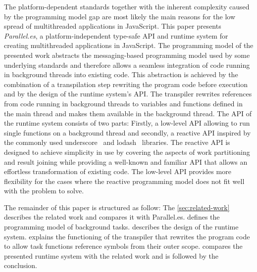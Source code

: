 The platform-dependent standards together with the inherent complexity caused by the programming model gap are most likely the main reasons for the low spread of multithreaded applications in JavaScript. This paper presents \textit{Parallel.es}, a platform-independent type-safe API and runtime system for creating multithreaded applications in JavaScript. The programming model of the presented work abstracts the messaging-based programming model used by some underlying standards and therefore allows a seamless integration of code running in background threads into existing code. This abstraction is achieved by the combination of a transpilation step rewriting the program code before execution and by the design of the runtime system's API. The transpiler rewrites references from code running in background threads to variables and functions defined in the main thread and makes them available in the background thread. The API of the runtime system consists of two parts: Firstly, a low-level API allowing to run single functions on a background thread and secondly, a reactive API inspired by the commonly used underscore~\cite{underscorejs} and lodash~\cite{lodash} libraries. The reactive API is designed to achieve simplicity in use by covering the aspects of work partitioning and result joining while providing a well-known and familiar API that allows an effortless transformation of existing code. The low-level API provides more flexibility for the cases where the reactive programming model does not fit well with the problem to solve.

The remainder of this paper is structured as follow: The \cref{sec:related-work} describes the related work and compares it with Parallel.es.  defines the programming model of background tasks.  describes the design of the runtime system.  explains the functioning of the transpiler that rewrites the program code to allow task functions reference symbols from their outer scope.  compares the presented runtime system with the related work and is followed by the conclusion. 